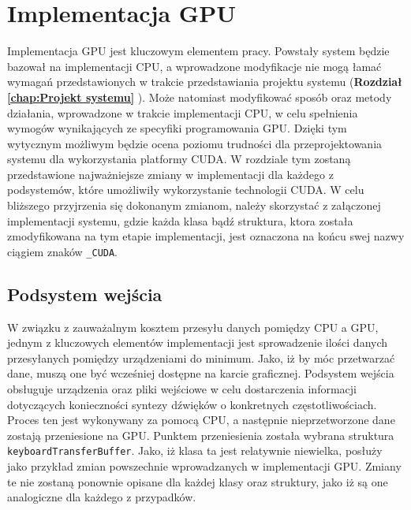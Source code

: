 \chapter{Implementacja GPU}
Implementacja GPU jest kluczowym elementem pracy. Powstały system będzie bazował na implementacji CPU, a wprowadzone modyfikacje nie mogą łamać wymagań przedstawionych w trakcie przedstawiania projektu systemu (\textbf{Rozdział \ref{chap:Projekt systemu} }). Może natomiast modyfikować sposób oraz metody działania, wprowadzone w trakcie implementacji CPU, w celu spełnienia wymogów wynikających ze specyfiki programowania GPU. Dzięki tym wytycznym możliwym będzie ocena poziomu trudności dla przeprojektowania systemu dla wykorzystania platformy CUDA\cite{bib:CUDA}. W rozdziale tym zostaną przedstawione najważniejsze zmiany w implementacji dla każdego z podsystemów, które umożliwiły wykorzystanie technologii CUDA\cite{bib:CUDA}. W celu bliższego przyjrzenia się dokonanym zmianom, należy skorzystać z załączonej implementacji systemu, gdzie każda klasa bądź struktura, ktora została zmodyfikowana na tym etapie implementacji, jest oznaczona na końcu swej nazwy ciągiem znaków \texttt{\_CUDA}.

\section{Podsystem wejścia}
W związku z zauważalnym kosztem przesyłu danych pomiędzy CPU a GPU, jednym z kluczowych elementów implementacji jest sprowadzenie ilości danych przesyłanych pomiędzy urządzeniami do minimum. Jako, iż by móc przetwarzać dane, muszą one być wcześniej dostępne na karcie graficznej. Podsystem wejścia obsługuje urządzenia oraz pliki wejściowe w celu dostarczenia informacji dotyczących konieczności syntezy dźwięków o konkretnych częstotliwościach. Proces ten jest wykonywany za pomocą CPU, a następnie nieprzetworzone dane zostają przeniesione na GPU. Punktem przeniesienia została wybrana struktura \texttt{keyboardTransferBuffer}. Jako, iż klasa ta jest relatywnie niewielka, posłuży jako przykład zmian powszechnie wprowadzanych w implementacji GPU. Zmiany te nie zostaną ponownie opisane dla każdej klasy oraz struktury, jako iż są one analogiczne dla każdego z przypadków.

